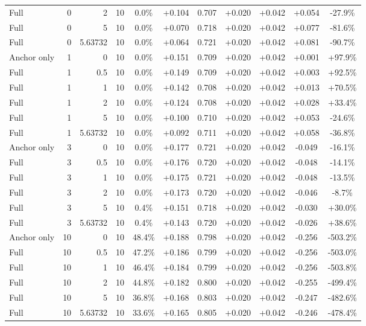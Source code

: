 \begin{table}[htbp]
\begin{tabular}{lrrrccccccc}
Full & 0 & 2 & 10 & 0.0\% & +0.104 & 0.707 & +0.020 & +0.042 & +0.054 & -27.9\% \\
Full & 0 & 5 & 10 & 0.0\% & +0.070 & 0.718 & +0.020 & +0.042 & +0.077 & -81.6\% \\
Full & 0 & 5.63732 & 10 & 0.0\% & +0.064 & 0.721 & +0.020 & +0.042 & +0.081 & -90.7\% \\
Anchor only & 1 & 0 & 10 & 0.0\% & +0.151 & 0.709 & +0.020 & +0.042 & +0.001 & +97.9\% \\
Full & 1 & 0.5 & 10 & 0.0\% & +0.149 & 0.709 & +0.020 & +0.042 & +0.003 & +92.5\% \\
Full & 1 & 1 & 10 & 0.0\% & +0.142 & 0.708 & +0.020 & +0.042 & +0.013 & +70.5\% \\
Full & 1 & 2 & 10 & 0.0\% & +0.124 & 0.708 & +0.020 & +0.042 & +0.028 & +33.4\% \\
Full & 1 & 5 & 10 & 0.0\% & +0.100 & 0.710 & +0.020 & +0.042 & +0.053 & -24.6\% \\
Full & 1 & 5.63732 & 10 & 0.0\% & +0.092 & 0.711 & +0.020 & +0.042 & +0.058 & -36.8\% \\
Anchor only & 3 & 0 & 10 & 0.0\% & +0.177 & 0.721 & +0.020 & +0.042 & -0.049 & -16.1\% \\
Full & 3 & 0.5 & 10 & 0.0\% & +0.176 & 0.720 & +0.020 & +0.042 & -0.048 & -14.1\% \\
Full & 3 & 1 & 10 & 0.0\% & +0.175 & 0.721 & +0.020 & +0.042 & -0.048 & -13.5\% \\
Full & 3 & 2 & 10 & 0.0\% & +0.173 & 0.720 & +0.020 & +0.042 & -0.046 & -8.7\% \\
Full & 3 & 5 & 10 & 0.4\% & +0.151 & 0.718 & +0.020 & +0.042 & -0.030 & +30.0\% \\
Full & 3 & 5.63732 & 10 & 0.4\% & +0.143 & 0.720 & +0.020 & +0.042 & -0.026 & +38.6\% \\
Anchor only & 10 & 0 & 10 & 48.4\% & +0.188 & 0.798 & +0.020 & +0.042 & -0.256 & -503.2\% \\
Full & 10 & 0.5 & 10 & 47.2\% & +0.186 & 0.799 & +0.020 & +0.042 & -0.256 & -503.0\% \\
Full & 10 & 1 & 10 & 46.4\% & +0.184 & 0.799 & +0.020 & +0.042 & -0.256 & -503.8\% \\
Full & 10 & 2 & 10 & 44.8\% & +0.182 & 0.800 & +0.020 & +0.042 & -0.255 & -499.4\% \\
Full & 10 & 5 & 10 & 36.8\% & +0.168 & 0.803 & +0.020 & +0.042 & -0.247 & -482.6\% \\
Full & 10 & 5.63732 & 10 & 33.6\% & +0.165 & 0.805 & +0.020 & +0.042 & -0.246 & -478.4\% \\

\end{tabular}
\end{table}
